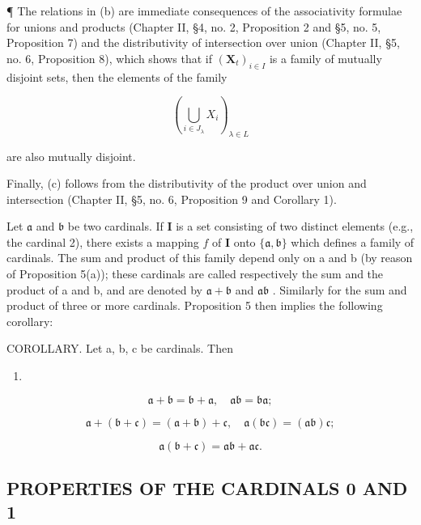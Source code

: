 ¶ The relations in (b) are immediate consequences of the associativity formulae for unions and products (Chapter II, §4, no. 2, Proposition 2 and §5, no. 5, Proposition 7) and the distributivity of intersection over union (Chapter II, §5, no. 6, Proposition 8), which shows that if \((\mathbf{X}_{t})_{i\in I}\) is a family of mutually disjoint sets, then the elements of the family

\[
\left(\bigcup_ {i \in J _ {\lambda}} X _ {i}\right) _ {\lambda \in L}
\]

are also mutually disjoint.

Finally, (c) follows from the distributivity of the product over union and intersection (Chapter II, §5, no. 6, Proposition 9 and Corollary 1).

Let \(\mathfrak{a}\) and \(\mathfrak{b}\) be two cardinals. If \(\mathbf{I}\) is a set consisting of two distinct elements (e.g., the cardinal 2), there exists a mapping \(f\) of \(\mathbf{I}\) onto \(\{\mathfrak{a}, \mathfrak{b}\}\) which defines a family of cardinals. The sum and product of this family depend only on a and b (by reason of Proposition 5(a)); these cardinals are called respectively the sum and the product of a and b, and are denoted by \(\mathfrak{a} + \mathfrak{b}\) and \(\mathfrak{a}\mathfrak{b}\) . Similarly for the sum and product of three or more cardinals. Proposition 5 then implies the following corollary:

COROLLARY. Let a, b, c be cardinals. Then

\begin{enumerate}
\def\labelenumi{(\arabic{enumi})}
\tightlist
\item
\end{enumerate}

\[
\mathfrak {a} + \mathfrak {b} = \mathfrak {b} + \mathfrak {a}, \quad \mathfrak {a}\mathfrak {b} = \mathfrak {b}\mathfrak {a};\tag{2}
\]

\[
\mathfrak {a} + (\mathfrak {b} + \mathfrak {c}) = (\mathfrak {a} + \mathfrak {b}) + \mathfrak {c}, \quad \mathfrak {a}(\mathfrak {b}\mathfrak {c}) = (\mathfrak {a}\mathfrak {b})\mathfrak {c};\tag{3}
\]

\[
\mathfrak {a} (\mathfrak {b} + \mathfrak {c}) = \mathfrak {a}\mathfrak {b} + \mathfrak {a}\mathfrak {c}.
\]

\subsection{PROPERTIES OF THE CARDINALS 0 AND 1}

